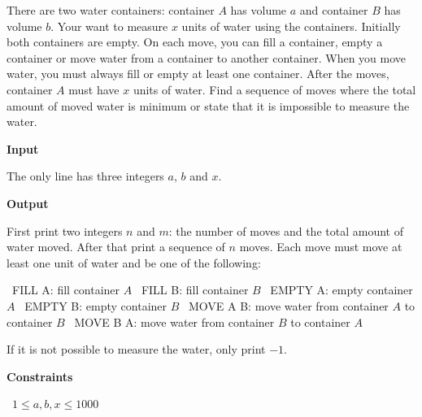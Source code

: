 There are two water containers: container $A$ has volume $a$ and container $B$ has volume $b$. Your want to measure $x$ units of water using the containers.
Initially both containers are empty. On each move, you can fill a container, empty a container or move water from a container to another container. When you move water, you must always fill or empty at least one container. After the moves, container $A$ must have $x$ units of water.
Find a sequence of moves where the total amount of moved water is minimum or state that it is impossible to measure the water.

\vspace{0.3cm}\noindent\textbf{Input}

The only line has three integers $a$, $b$ and $x$.

\vspace{0.3cm}\noindent\textbf{Output}

First print two integers $n$ and $m$: the number of moves and the total amount of water moved. After that print a sequence of $n$ moves. Each move must move at least one unit of water and be one of the following:

\textbullet\ FILL A: fill container $A$
\textbullet\ FILL B: fill container $B$
\textbullet\ EMPTY A: empty container $A$
\textbullet\ EMPTY B: empty container $B$
\textbullet\ MOVE A B: move water from container $A$ to container $B$
\textbullet\ MOVE B A: move water from container $B$ to container $A$

If it is not possible to measure the water, only print $-1$.

\vspace{0.3cm}\noindent\textbf{Constraints}

\textbullet\ $1 \le a, b, x \le 1000$